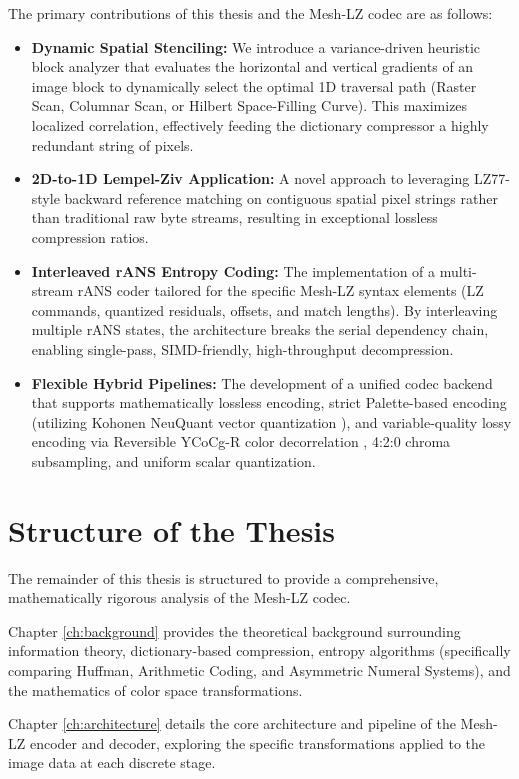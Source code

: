 The primary contributions of this thesis and the Mesh-LZ codec are as follows:
\begin{itemize}
    \item \textbf{Dynamic Spatial Stenciling:} We introduce a variance-driven heuristic block analyzer that evaluates the horizontal and vertical gradients of an image block to dynamically select the optimal 1D traversal path (Raster Scan, Columnar Scan, or Hilbert Space-Filling Curve). This maximizes localized correlation, effectively feeding the dictionary compressor a highly redundant string of pixels.
    \item \textbf{2D-to-1D Lempel-Ziv Application:} A novel approach to leveraging LZ77-style backward reference matching on contiguous spatial pixel strings rather than traditional raw byte streams, resulting in exceptional lossless compression ratios.
    \item \textbf{Interleaved rANS Entropy Coding:} The implementation of a multi-stream rANS coder tailored for the specific Mesh-LZ syntax elements (LZ commands, quantized residuals, offsets, and match lengths). By interleaving multiple rANS states, the architecture breaks the serial dependency chain, enabling single-pass, SIMD-friendly, high-throughput decompression.
    \item \textbf{Flexible Hybrid Pipelines:} The development of a unified codec backend that supports mathematically lossless encoding, strict Palette-based encoding (utilizing Kohonen NeuQuant vector quantization \cite{dekker1994kohonen}), and variable-quality lossy encoding via Reversible YCoCg-R color decorrelation \cite{malvar2003lifting}, 4:2:0 chroma subsampling, and uniform scalar quantization.
\end{itemize}

\section{Structure of the Thesis}

The remainder of this thesis is structured to provide a comprehensive, mathematically rigorous analysis of the Mesh-LZ codec. 

Chapter \ref{ch:background} provides the theoretical background surrounding information theory, dictionary-based compression, entropy algorithms (specifically comparing Huffman, Arithmetic Coding, and Asymmetric Numeral Systems), and the mathematics of color space transformations. 

Chapter \ref{ch:architecture} details the core architecture and pipeline of the Mesh-LZ encoder and decoder, exploring the specific transformations applied to the image data at each discrete stage. 

